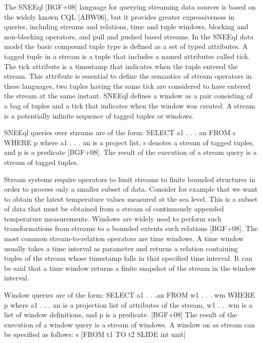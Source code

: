 The SNEEql [BGF+08] language for querying streaming data sources is based on the widely known CQL [ABW06], but it provides greater expressiveness in queries, including streams and relations, time and tuple windows, blocking and non-blocking operators, and pull and pushed based streams. 
In the SNEEql data model the basic compound tuple type is defined as a set of typed attributes. A tagged tuple in a stream is a tuple that includes a named attributes called tick. The tick attribute is a timestamp that indicates when the tuple entered the stream. This attribute is essential to define the semantics of stream operators in these languages, two tuples having the same tick are considered to have entered the stream at the same instant.
SNEEql defines a window as a pair consisting of a bag of tuples and a tick that indicates when the window was created. A stream is a potentially infinite sequence of tagged tuples or windows.

SNEEql queries over streams are of the form:
\textsf{SELECT a1 . . . an FROM s WHERE p} where \textsf{a1 . . . an} is a project list, s denotes a stream of tagged tuples, and p is a predicate [BGF+08]. The result of the execution of a stream query is a stream of tagged tuples.

Stream systems require operators to limit streams to finite bounded structures in order to process only a smaller subset of data. Consider for example that we want to obtain the latest temperature values measured at the sea level. This is a subset of data that must be obtained from a stream of continuously appended temperature measurements. Windows are widely used to perform such transformations from streams to a bounded extents such relations [BGF+08]. The most common stream-to-relation operators are time windows. A time window usually takes a time interval as parameter and returns a relation containing tuples of the stream whose timestamp falls in that specified time interval. It can be said that a time window returns a finite snapshot of the stream in the window interval.

Window queries are of the form:
\textsf{SELECT a1 . . .an FROM w1 . . . wm WHERE p}
where \textsf{a1 . . . an} is a projection list of attributes of the stream, \textsf{w1 . . .wm} is a list of window definitions, and p is a predicate. [BGF+08]
The result of the execution of a window query is a stream of windows. A window on as stream can be specified as follows:
\textsf{s [FROM t1 TO t2 SLIDE int unit]}

